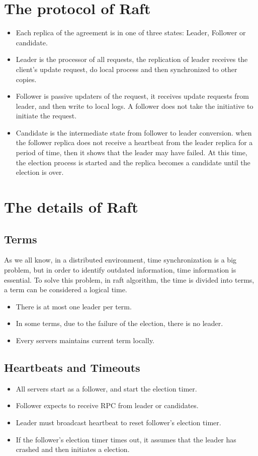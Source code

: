 \documentclass{report}
\begin{document}
\section{The protocol of Raft}
\begin{itemize}
\item Each replica of the agreement is in one of three states: Leader, Follower or candidate.
\item Leader is the processor of all requests, the replication of leader receives the client's update request, do local process and then synchronized to other copies.
\item Follower is passive updaters of the request, it receives update requests from leader, and then write to local logs. A follower does not take the initiative to initiate the request.
\item Candidate is the intermediate state from follower to leader conversion. when the follower replica does not receive a heartbeat from the leader replica for a period of time, then it shows that the leader may have failed. At this time, the election process is started and the replica becomes a candidate until the election is over.
\end{itemize}

\section{The details of Raft}
\subsection{Terms}
As we all know, in a distributed environment, time synchronization is a big problem, but in order to identify outdated information, time information is essential. To solve this problem, in raft algorithm, the time is divided into terms, a term can be considered a logical time.
\begin{itemize}
\item There is at most one leader per term.
\item In some terms, due to the failure of the election, there is no leader.
\item Every servers maintains current term locally.
\end{itemize}
\subsection{Heartbeats and Timeouts}
\begin{itemize}
\item All servers start as a follower, and start the election timer.
\item Follower expects to receive RPC from leader or candidates.
\item Leader must broadcast heartbeat to reset follower's election timer.
\item If the follower’s election timer times out, it assumes that the leader has crashed and then initiates a election.
\end{itemize}
\end{document}
